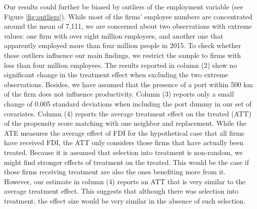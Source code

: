 \documentclass[a4paper,11pt]{scrartcl}
\begin{document}
Our results could further be biased by outliers of the employment variable (see Figure \ref{fig:outliers}). While most of the firms' employee numbers are concentrated around the mean of 7,111, we are concerned about two observations with extreme values: one firm with over eight million employees, and another one that apparently employed more than four million people in 2015. To check whether these outliers influence our main findings, we restrict the sample to firms with less than four million employees. The results reported in column (2) show no significant change in the treatment effect when excluding the two extreme observations. %
Besides, we have assumed that the presence of a port within 500 km of the firm does not influence productivity. %
Column (3) reports only a small change of 0.005 standard deviations when including the port dummy in our set of covariates. 
Column (4) reports the average treatment effect on the treated (ATT) of the propensity score matching with one neighbor and replacement. While the ATE measures the average effect of FDI %
for the hypothetical case that all firms have received FDI, the ATT only considers those firms that have actually been treated. Because it is assumed that selection into treatment is non-random, we might find stronger effects of treatment on the treated. This would be the case if those firms receiving treatment are also the ones benefiting more from it. %
 However, our estimate in column (4) reports an ATT that is very similar to the average treatment effect. This suggests that although there was selection into treatment, the effect size would be very similar in the absence of such selection. 
\end{document}
